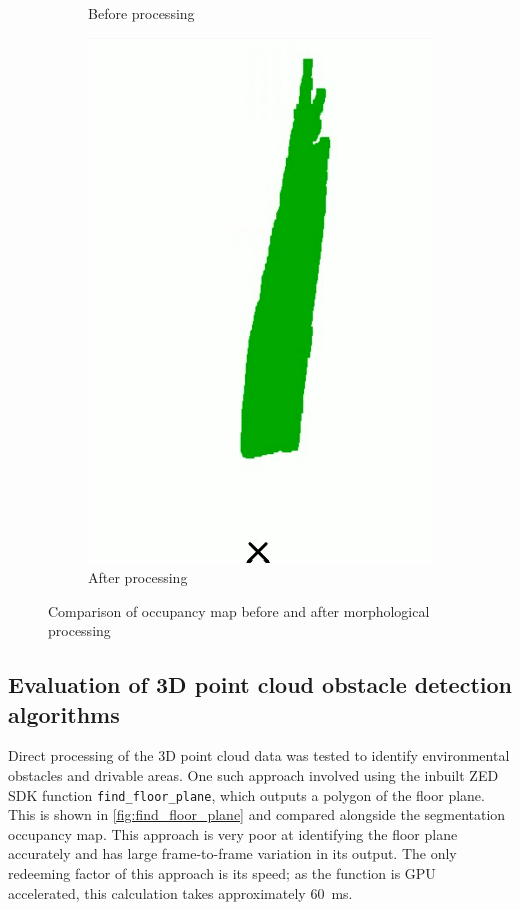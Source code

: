 \begin{figure}[b]
\begin{subfigure}{.4\textwidth}
        \caption{Before processing}
    \end{subfigure}
    \quad
    \begin{subfigure}{.4\textwidth}
        \centering
        \includegraphics[width=\linewidth,frame]{images/occupancy_map1.png}
        \caption{After processing}
    \end{subfigure}
    \caption{Comparison of occupancy map before and after morphological processing}
    \label{fig:morphological_processing}
\end{figure}
\pagebreak
\subsection{Evaluation of 3D point cloud obstacle detection algorithms}
Direct processing of the 3D point cloud data was tested to identify environmental obstacles and drivable areas.
One such approach involved using the inbuilt ZED SDK function \texttt{find\_floor\_plane},
which outputs a polygon of the floor plane.
This is shown in \cref{fig:find_floor_plane} and compared alongside the segmentation occupancy map.
This approach is very poor at identifying the floor plane accurately and has large frame-to-frame
variation in its output. The only redeeming factor of this approach is its speed;
as the function is GPU accelerated, this calculation takes approximately \SI{60}{\milli\second}.

